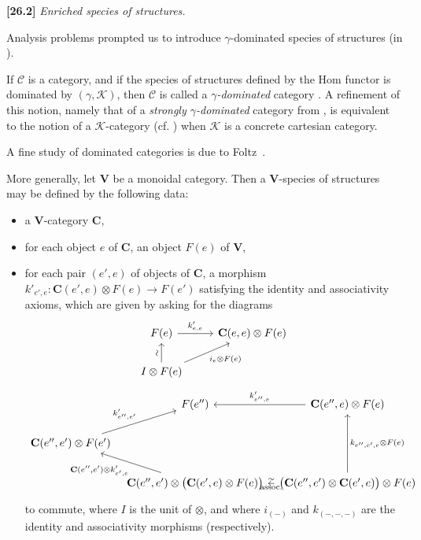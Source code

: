 \documentclass[a4paper,fleqn]{article}
\theoremstyle{plain}
\theoremstyle{definition}
\newenvironment{longcomm}[1]
  {\noindent\textbf{[#1]}\rmfamily}
  {}
\newcommand{\CC}{\mathcal{C}}
\newcommand{\KK}{\mathcal{K}}
\begin{document}
\begin{longcomm}{26.2}
  \emph{Enriched species of structures.}

  Analysis problems prompted us to introduce $\gamma$-dominated species of structures (in \cite{comm28}).

  If $\CC$ is a category, and if the species of structures defined by the Hom functor is dominated by $(\gamma,\KK)$, then $\CC$ is called a \emph{$\gamma$-dominated} category \cite{coll77}.
  A refinement of this notion, namely that of a \emph{strongly $\gamma$-dominated} category from \cite{coll104,coll109}, is equivalent to the notion of a $\KK$-category (cf. \cite{comm31}) when $\KK$ is a concrete cartesian category.

  A fine study of dominated categories is due to Foltz~\cite{comm33}.

  More generally, let $\mathbf{V}$ be a monoidal category.
  Then a {$\mathbf{V}$-species of structures} may be defined by the following data:
  \begin{itemize}
    \item a $\mathbf{V}$-category $\mathbf{C}$,

    \item for each object $e$ of $\mathbf{C}$, an object $F(e)$ of $\mathbf{V}$,

    \item for each pair $(e',e)$ of objects of $\mathbf{C}$, a morphism $k'_{e',e}\colon\mathbf{C}(e',e)\otimes F(e)\to F(e')$ satisfying the identity and associativity axioms, which are given by asking for the diagrams
    \[
      \begin{tikzcd}
        F(e)
          \ar[r,"k'_{e,e}"]
        & \mathbf{C}(e,e)\otimes F(e)
      \\I\otimes F(e)
          \ar[u,"\sim"{anchor=south,rotate=90}]
          \ar[ur,swap,"i_e\otimes F(e)"]
      \end{tikzcd}
    \]
    \[
      \begin{tikzcd}[column sep=tiny]
        & F(e'')
        & \mathbf{C}(e'',e)\otimes F(e)
          \ar[l,swap,"k'_{e'',e}"]
      \\\mathbf{C}(e'',e')\otimes F(e')
          \ar[ur,"k'_{e'',e'}"]
      \\& \mathbf{C}(e'',e')\otimes\big(\mathbf{C}(e',e)\otimes F(e)\big)
          \ar[ul,"{\mathbf{C}(e'',e')\otimes k'_{e',e}}"]
        & \big(\mathbf{C}(e'',e')\otimes\mathbf{C}(e',e)\big)\otimes F(e)
          \ar[l,swap,"\sim","\mathrm{assoc.}"{below}]
          \ar[uu,swap,"k_{e'',e',e}\otimes F(e)"]
      \end{tikzcd}
    \]
    to commute, where $I$ is the unit of $\otimes$, and where $i_{(-)}$ and $k_{(-,-,-)}$ are the identity and associativity morphisms (respectively).
  \end{itemize}


\end{longcomm}
\end{document}
